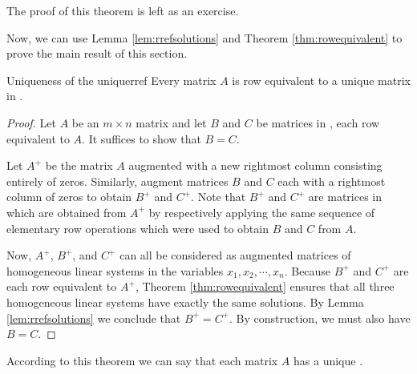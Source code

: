 The proof of this theorem is left as an exercise. 

Now, we can use Lemma \ref{lem:rrefsolutions} and Theorem \ref{thm:rowequivalent} to prove the main result of this section.

\begin{theorem}{Uniqueness of the {\RREF}}{uniquerref}
Every matrix $A$ is row equivalent to a unique matrix in {\rref}.
\end{theorem}

\begin{proof}
Let $A$ be an $m \times n$ matrix and let $B$ and $C$ be matrices in {\rref}, each row equivalent to $A$. It suffices to show that $B=C$.

Let $A^{+}$ be the matrix $A$ augmented with a new rightmost column consisting entirely of zeros. Similarly, augment matrices $B$ and $C$ each with a rightmost column of zeros to obtain $B^{+}$ and $C^{+}$. Note that $B^{+}$ and $C^{+}$
are matrices in {\rref} which are obtained from $A^{+}$ by respectively applying the same sequence of elementary row operations which were used to obtain $B$ and $C$ from $A$. 

Now, $A^{+}$, $B^{+}$, and $C^{+}$ can all be considered as augmented matrices of homogeneous linear systems in the variables $x_1, x_2, \cdots, x_n$. Because $B^{+}$ and $C^{+}$ are each row equivalent to $A^{+}$, Theorem \ref{thm:rowequivalent} ensures that all three homogeneous linear systems have exactly the same solutions. By Lemma \ref{lem:rrefsolutions} we conclude that $B^{+}=C^{+}$. By construction, we must also have $B=C$. 
\end{proof}

According to this theorem we can say that each matrix $A$ has a unique {\rref}.
